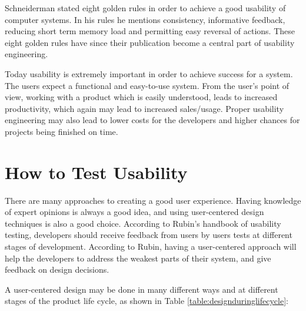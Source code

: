 Schneiderman stated eight golden rules in order to achieve a good usability of computer systems\cite{shneiderman2003designing}. In his rules he mentions consistency, informative feedback, reducing short term memory load and permitting easy reversal of actions. These eight golden rules have since their publication become a central part of usability engineering.

Today usability is extremely important in order to achieve success for a system. The users expect a functional and easy-to-use system. From the user's point of view, working with a product which is easily understood, leads to increased productivity, which again may lead to increased sales/usage\cite{folmer2004architecting}. Proper usability engineering may also lead to lower costs for the developers and higher chances for projects being finished on time\cite{nielsen1994usability}. 


\section{How to Test Usability}
\label{sec:howtotestusability}
There are many approaches to creating a good user experience. Having knowledge of expert opinions is always a good idea, and using user-centered design techniques is also a good choice. According to Rubin's handbook of usability testing\cite{rubin2008handbook}, developers should receive feedback from users by users tests at different stages of development. According to Rubin, having a user-centered approach will help the developers to address the weakest parts of their system, and give feedback on design decisions. 

A user-centered design may be done in many different ways and at different stages of the product life cycle\cite{abrasusercentereddesign}, as shown in Table \ref{table:designduringlifecycle}:

